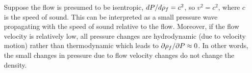 \documentclass[../Article_Model_Parameters.tex]{subfiles}
\begin{document}
	Suppose the flow is presumed to be isentropic, $d{\color{black}P}/d{\color{black}\rho_f} = c^2$, so $v^2=c^2$, where $c$ is the speed of sound. This can be interpreted as a small pressure wave propagating with the speed of sound relative to the flow. Moreover, if the flow velocity is relatively low, all pressure changes are hydrodynamic (due to velocity motion) rather than thermodynamic which leads to $\partial {\color{black}\rho_f} / \partial {\color{black}P} \approx 0$. In other words, the small changes in pressure due to flow velocity changes do not change the density. %
\end{document}
